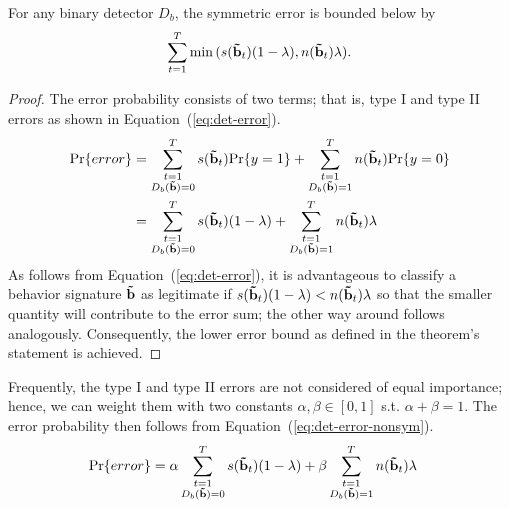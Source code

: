\begin{theorem}
For any binary detector $D_b$, the symmetric error is bounded below by
$$
\sum_{t=1}^T \min{(s(\mathbf{\tilde{b}}_t) (1-\lambda), n(\mathbf{\tilde{b}}_t) \lambda)}.
$$
\end{theorem}
\begin{proof}
The error probability consists of two terms; that is, type I and type II errors as shown in Equation~(\ref{eq:det-error}).
\begin{equation}
\begin{aligned}
		\text{Pr}\{error\} 
		&= \sum_{\substack{t=1 \\ D_b(\mathbf{\tilde{b}})=0}}^T s(\mathbf{\tilde{b}}_t) \text{Pr}\{y=1\} + \sum_{\substack{t=1 \\ D_b(\mathbf{\tilde{b}})=1}}^T n(\mathbf{\tilde{b}}_t) \text{Pr}\{y=0\} \\
		&= \sum_{\substack{t=1 \\ D_b(\mathbf{\tilde{b}})=0}}^T s(\mathbf{\tilde{b}}_t) (1-\lambda) + \sum_{\substack{t=1 \\ D_b(\mathbf{\tilde{b}})=1}}^T n(\mathbf{\tilde{b}}_t) \lambda
\end{aligned}
\label{eq:det-error}
\end{equation}
\noindent
As follows from Equation~(\ref{eq:det-error}), it is advantageous to classify a behavior signature $\mathbf{\tilde{b}}$ as legitimate if $s(\mathbf{\tilde{b}}_t) (1-\lambda) < n(\mathbf{\tilde{b}}_t) \lambda$ so that the smaller quantity will contribute to the error sum; the other way around follows analogously. Consequently, the lower error bound as defined in the theorem's statement is achieved.
\end{proof}

Frequently, the type I and type II errors are not considered of equal importance; hence, we can weight them with two constants $\alpha, \beta \in [0,1]$ s.t. $\alpha+\beta=1$. The error probability then follows from Equation~(\ref{eq:det-error-nonsym}). 
\begin{equation}
\begin{aligned}
		\text{Pr}\{error\} 
		&= \alpha \sum_{\substack{t=1 \\ D_b(\mathbf{\tilde{b}})=0}}^T s(\mathbf{\tilde{b}}_t) (1-\lambda) + \beta \sum_{\substack{t=1 \\ D_b(\mathbf{\tilde{b}})=1}}^T n(\mathbf{\tilde{b}}_t) \lambda
\end{aligned}
\label{eq:det-error-nonsym}
\end{equation}



%
%

